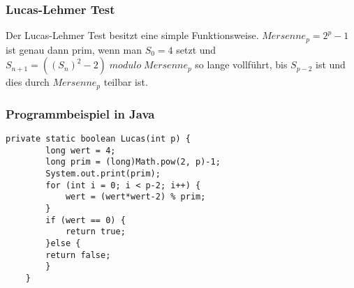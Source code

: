 \subsubsection{Lucas-Lehmer Test}
Der Lucas-Lehmer Test besitzt eine simple Funktionsweise. $Mersenne_p=2^p-1$ ist genau dann prim, wenn man $S_0=4$ setzt und $S_{n+1}=((S_n)^2-2)\;modulo\;Mersenne_p$ so lange vollführt, bis $S_{p-2}$ ist und dies durch $Mersenne_p$ teilbar ist.
\subsubsection{Programmbeispiel in Java}
\lstset{language=Java} 
\begin{lstlisting}[frame=single]
private static boolean Lucas(int p) {
		long wert = 4;
		long prim = (long)Math.pow(2, p)-1;
		System.out.print(prim);
		for (int i = 0; i < p-2; i++) {
			wert = (wert*wert-2) % prim;			
		}
		if (wert == 0) {
			return true;			
		}else {
		return false;
		}
	}
\end{lstlisting}
